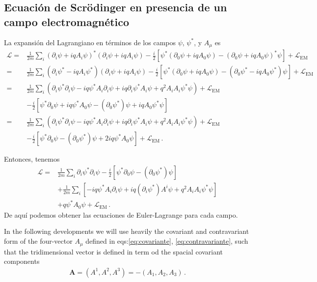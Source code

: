 \begin{subappendices}
\section{Ecuación de Scrödinger en presencia de un campo electromagnético}

La expansión del Lagrangiano en términos de los campos $\psi$, $\psi^*$, y $A_\mu$ es %
\begin{align}
\label{eq:178qft}
   \mathcal{L}
=&\frac{1}{2m}\sum_i\left(\partial_i\psi+i q A_i\psi\right)^*\left(\partial_i\psi+i q A_i\psi\right)-\frac{i}{2}
  \left[\psi^*\left(\partial_0\psi+i q A_0\psi\right)-\left(\partial_0\psi+i q A_0\psi\right)^*\psi\right]+\mathcal{L}_{\text{EM}} 
\nonumber\\
=&\frac{1}{2m}\sum_i\left(\partial_i\psi^*-i q A_i\psi^*\right)\left(\partial_i\psi+i q A_i\psi\right)-\frac{i}{2}
  \left[\psi^*\left(\partial_0\psi+i q A_0\psi\right)-\left(\partial_0\psi^*-i q A_0\psi^*\right)\psi\right]+\mathcal{L}_{\text{EM}}
\nonumber\\
 =&\frac{1}{2m}\sum_i\left(\partial_i\psi^*\partial_i\psi-i q \psi^*A_i\partial_i\psi+i q \partial_i\psi^*A_i\psi+q^2A_i A_i \psi^*\psi\right)
+\mathcal{L}_{\text{EM}}
\nonumber\\
 &-\frac{i}{2}
  \left[\psi^*\partial_0\psi+i q \psi^*A_0\psi-(\partial_0\psi^*)\psi+i q A_0\psi^*\psi\right]\nonumber\\
 =&\frac{1}{2m}\sum_i\left(\partial_i\psi^*\partial_i\psi-i q \psi^*A_i\partial_i\psi+i q \partial_i\psi^*A_i\psi+q^2A_i A_i \psi^*\psi\right)
+\mathcal{L}_{\text{EM}}
\nonumber\\
 &-\frac{i}{2}
  \left[\psi^*\partial_0\psi-(\partial_0\psi^*)\psi+2 i q \psi^*A_0\psi\right]+\mathcal{L}_{\text{EM}}\,.
 \end{align}

Entonces, tenemos
\begin{align}
  \mathcal{L}=&\frac{1}{2m}\sum_i\partial_i\psi^*\partial_i\psi
-\frac{i}{2}
  \left[\psi^*\partial_0\psi-(\partial_0\psi^*)\psi\right] \nonumber\\
&+\frac{1}{2m}\sum_i\left[ -i q \psi^*A_i\partial_i\psi+i q \left(\partial_i\psi^*\right) A^i\psi+q^2A_i A_i \psi^*\psi\right]\nonumber\\
 &+ q \psi^*A_0\psi+\mathcal{L}_{\text{EM}}\,.
 \end{align}
De aquí podemos obtener las ecuaciones de Euler-Lagrange para cada campo.



In the following developments we will use heavily  the covariant and contravariant form of the four-vector $A_{\mu}$ defined in eqs:\eqref{eq:covariante}, \eqref{eq:contravariante}, such that the tridimensional vector is defined in term od the spacial covariant components
\begin{align*}
  \mathbf{A}=\left( A^1,A^2,A^3\right)=-\left( A_1,A_2,A_3\right)\,.
\end{align*}


\end{subappendices}
